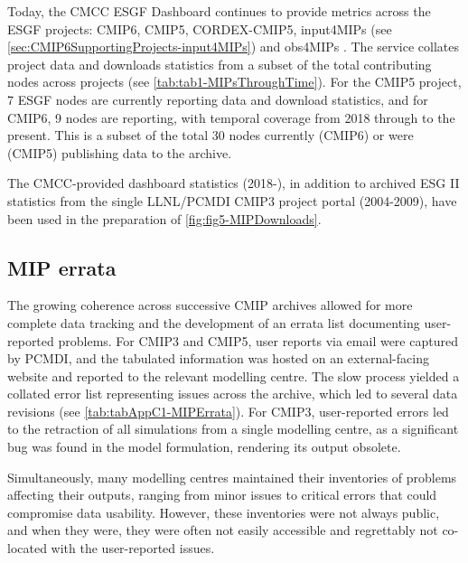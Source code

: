 \documentclass[manuscript]{copernicus}
\newcommand{\mycomment}[1]{}
\def\cred#1{{\color{red}#1}}
\begin{document}
Today, the CMCC ESGF Dashboard continues to provide metrics across the ESGF projects: CMIP6, CMIP5, CORDEX-CMIP5, input4MIPs (see \autoref{sec:CMIP6SupportingProjects-input4MIPs}) and obs4MIPs \citep{fiore_climate_2019}. The service collates project data and downloads statistics from a subset of the total contributing nodes across projects (see \autoref{tab:tab1-MIPsThroughTime}). For the CMIP5 project, 7 ESGF nodes are currently reporting data and download statistics, and for CMIP6, 9 nodes are reporting, with temporal coverage from 2018 through to the present. This is a subset of the total 30 nodes currently (CMIP6) or were (CMIP5) publishing data to the archive.

The CMCC-provided dashboard statistics (2018-), in addition to archived ESG II statistics from the single LLNL/PCMDI CMIP3 project portal (2004-2009), have been used in the preparation of \autoref{fig:fig5-MIPDownloads}.

\mycomment{
Imperfect:
CMIP3, single node, single report, 2004-2008
CMIP5, 30 nodes, 7 reporting statistics (all CMIP6 data node), 2018-present (missing 2010-2015, 2015-2018)
CMIP6, 30 nodes, 9 reporting statistics, 2018-present
Number of downloads (how time split across files matters), or per GB downloads
}


\subsection{MIP errata}
\label{sec:CMIPErrata}

The growing coherence across successive CMIP archives allowed for more complete data tracking and the development of an errata list documenting user-reported problems. For CMIP3 and CMIP5, user reports via email were captured by PCMDI, and the tabulated information was hosted on an external-facing website and reported to the relevant modelling centre. The slow process yielded a collated error list representing issues across the archive, which led to several data revisions (see \autoref{tab:tabAppC1-MIPErrata}). For CMIP3, user-reported errors led to the retraction of all simulations from a single modelling centre, as a significant bug was found in the model formulation, rendering its output obsolete.

Simultaneously, many modelling centres maintained their inventories of problems affecting their outputs, ranging from minor issues to critical errors that could compromise data usability. However, these inventories were not always public, and when they were, they were often not easily accessible and regrettably not co-located with the user-reported issues.
\end{document}

